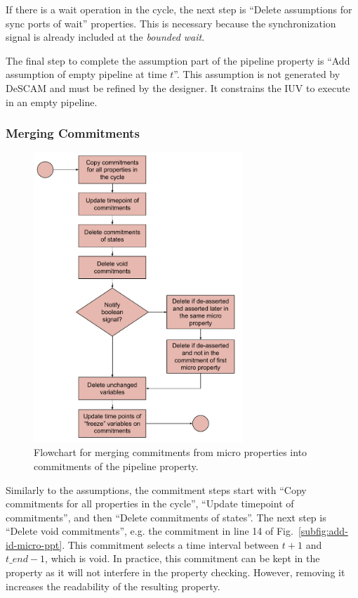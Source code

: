 If there is a wait operation in the cycle, the next step is “Delete assumptions for sync ports of wait” properties. This is necessary because the synchronization signal is already included at the \textit{bounded wait}.

The final step to complete the assumption part of the pipeline property is “Add assumption of empty pipeline at time $t$”. This assumption is not generated by DeSCAM and must be refined by the designer. It constrains the IUV to execute in an empty pipeline.

\subsubsection*{Merging Commitments}

\begin{figure}[htb!]
	\centering
	\includegraphics[width=0.7\textwidth]{images/algorithm_commitments.pdf}
	\caption{Flowchart for merging commitments from micro properties into commitments of the pipeline property.}
	\label{fig:algorithm-commitments-flow}
\end{figure}

Similarly to the assumptions, the commitment steps start with “Copy commitments for all properties in the cycle”, “Update timepoint of commitments”, and then “Delete commitments of states”. The next step is “Delete void commitments”, e.g. the commitment in line 14 of Fig.~\ref{subfig:add-id-micro-ppt}. This commitment selects a time interval between $t+1$ and $t\_end-1$, which is void. In practice, this commitment can be kept in the property as it will not interfere in the property checking. However, removing it increases the readability of the resulting property.


